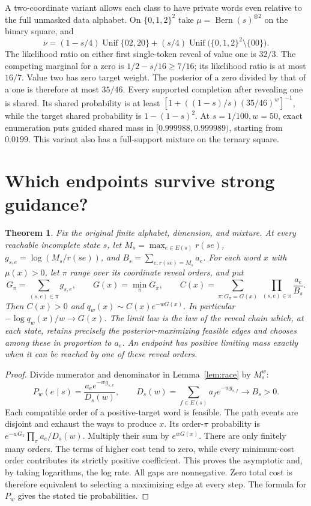 \documentclass[11pt]{article}
\newtheorem{theorem}{Theorem}
\newcommand{\bern}{\operatorname{Bern}}
\newcommand{\unif}{\operatorname{Unif}}
\begin{document}
A two-coordinate variant allows each class to have private words even relative to the full unmasked data alphabet. On \(\{0,1,2\}^2\) take \(\mu=\bern(s)^{\otimes2}\) on the binary square, and
\[
 \nu=(1-s/4)\unif\{02,20\}+(s/4)\unif\bigl(\{0,1,2\}^2\setminus\{00\}\bigr).
\]
The likelihood ratio on either first single-token reveal of value one is \(32/3\). The competing marginal for a zero is \(1/2-s/16\ge7/16\); its likelihood ratio is at most \(16/7\). Value two has zero target weight. The posterior of a zero divided by that of a one is therefore at most \(35/46\). Every supported completion after revealing one is shared. Its shared probability is at least \([1+((1-s)/s)(35/46)^w]^{-1}\), while the target shared probability is \(1-(1-s)^2\). At \(s=1/100,w=50\), exact enumeration puts guided shared mass in \([0.999988,0.999989)\), starting from \(0.0199\). This variant also has a full-support mixture on the ternary square.

\section{Which endpoints survive strong guidance?}
\begin{theorem}\label{thm:path}
Fix the original finite alphabet, dimension, and mixture. At every reachable incomplete state \(s\), let \(M_s=\max_{e\in E(s)}r(se)\), \(g_{s,e}=\log(M_s/r(se))\), and \(B_s=\sum_{e:r(se)=M_s}a_e\). For each word \(x\) with \(\mu(x)>0\), let \(\pi\) range over its coordinate reveal orders, and put
\[
 G_\pi=\sum_{(s,e)\in\pi} g_{s,e},\qquad
 G(x)=\min_\pi G_\pi,\qquad
 C(x)=\sum_{\pi:G_\pi=G(x)}\ \prod_{(s,e)\in\pi}\frac{a_e}{B_s}.
\]
Then \(C(x)>0\) and \(q_w(x)\sim C(x)e^{-wG(x)}\). In particular
\(-\log q_w(x)/w\to G(x)\). The limit law is the law of the reveal chain which, at each state, retains precisely the posterior-maximizing feasible edges and chooses among these in proportion to \(a_e\). An endpoint has positive limiting mass exactly when it can be reached by one of these reveal orders.
\end{theorem}
\begin{proof}
Divide numerator and denominator in Lemma~\ref{lem:race} by \(M_s^w\):
\[
 P_w(e\mid s)=\frac{a_e e^{-wg_{s,e}}}{D_s(w)},\qquad
 D_s(w)=\sum_{f\in E(s)} a_f e^{-wg_{s,f}}\longrightarrow B_s>0 .
\]
Each compatible order of a positive-target word is feasible. The path events are disjoint and exhaust the ways to produce \(x\). Its order-\(\pi\) probability is \(e^{-wG_\pi}\prod_\pi a_e/D_s(w)\). Multiply their sum by \(e^{wG(x)}\). There are only finitely many orders. The terms of higher cost tend to zero, while every minimum-cost order contributes its strictly positive coefficient. This proves the asymptotic and, by taking logarithms, the log rate. All gaps are nonnegative. Zero total cost is therefore equivalent to selecting a maximizing edge at every step. The formula for \(P_w\) gives the stated tie probabilities.
\end{proof}
\end{document}
